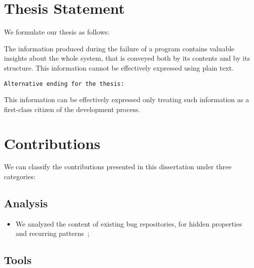 

\section{Thesis Statement}\label{sec:thesis}

We formulate our thesis as follows:

\begin{framed}
The information produced during the failure of a program contains valuable insights about the whole system, that is conveyed both by its contents and by its structure.
This information cannot be effectively expressed using plain text.
\end{framed}

\texttt{Alternative ending for the thesis:}
\begin{framed}
This information can be effectively expressed only treating such information as a first-class citizen of the development process.
\end{framed}

\section{Contributions}

We can classify the contributions presented in this dissertation under three categories:

\subsection{Analysis}

\begin{itemize}
  \item We analyzed the content of existing bug repositories, for hidden properties and recurring patterns~\cite{DalS2013a,DalS2016a};

\end{itemize}


\subsection{Tools}

